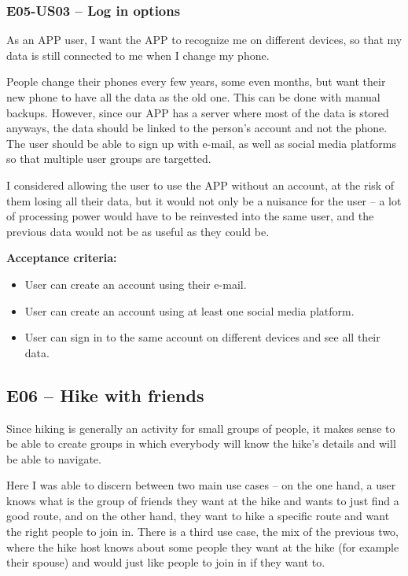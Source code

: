 \subsubsection*{E05-US03 -- Log in options}
As an APP user, I want the APP to recognize me on different devices, so that my data is still connected to me when I change my phone.

People change their phones every few years, some even months, but want their new phone to have all the data as the old one.
This can be done with manual backups.
However, since our APP has a server where most of the data is stored anyways, the data should be linked to the person's account and not the phone.
The user should be able to sign up with e-mail, as well as social media platforms so that multiple user groups are targetted.

I considered allowing the user to use the APP without an account, at the risk of them losing all their data, but it would not only be a nuisance for the user --
a lot of processing power would have to be reinvested into the same user, and the previous data would not be as useful as they could be.

\textbf{Acceptance criteria:}
\begin{itemize}
    \item User can create an account using their e-mail.
    \item User can create an account using at least one social media platform.
    \item User can sign in to the same account on different devices and see all their data.
\end{itemize}


\subsection*{E06 -- Hike with friends}

Since hiking is generally an activity for small groups of people, it makes sense to be able to create groups in which everybody will know the hike's details and will be able to navigate.

Here I was able to discern between two main use cases -- on the one hand, a user knows what is the group of friends they want at the hike and wants to just find a good route,
and on the other hand, they want to hike a specific route and want the right people to join in.
There is a third use case, the mix of the previous two, where the hike host knows about some people they want at the hike (for example their spouse) and would just like people to join in if they want to.

